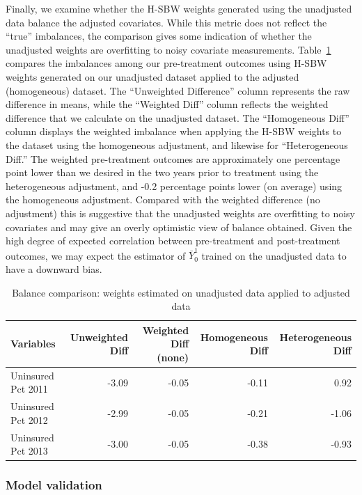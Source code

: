 \documentclass[aoas]{imsart}
\theoremstyle{plain}
\theoremstyle{remark}
\begin{document}
Finally, we examine whether the H-SBW weights generated using the unadjusted data balance the adjusted covariates. While this metric does not reflect the ``true'' imbalances, the comparison gives some indication of whether the unadjusted weights are overfitting to noisy covariate measurements. Table~\ref{tab:balcomp} compares the imbalances among our pre-treatment outcomes using H-SBW weights generated on our unadjusted dataset applied to the adjusted (homogeneous) dataset. The ``Unweighted Difference'' column represents the raw difference in means, while the ``Weighted Diff'' column reflects the weighted difference that we calculate on the unadjusted dataset. The ``Homogeneous Diff'' column displays the weighted imbalance when applying the H-SBW weights to the dataset using the homogeneous adjustment, and likewise for ``Heterogeneous Diff.'' The weighted pre-treatment outcomes are approximately one percentage point lower than we desired in the two years prior to treatment using the heterogeneous adjustment, and -0.2 percentage points lower (on average) using the homogeneous adjustment. Compared with the weighted difference (no adjustment) this is suggestive that the unadjusted weights are overfitting to noisy covariates and may give an overly optimistic view of balance obtained. Given the high degree of expected correlation between pre-treatment and post-treatment outcomes, we may expect the estimator of $\bar{Y}^1_0$ trained on the unadjusted data to have a downward bias.

\begin{table}[ht]
\caption{Balance comparison: weights estimated on unadjusted data applied to adjusted data}
\label{tab:balcomp}
\begin{tabular}{lrrrr}
  \hline
Variables & Unweighted Diff & Weighted Diff (none) & Homogeneous Diff & Heterogeneous Diff\\ 
  \hline
Uninsured Pct 2011 & -3.09 & -0.05 & -0.11 & 0.92 \\ 
  Uninsured Pct 2012 & -2.99 & -0.05 & -0.21 & -1.06 \\ 
  Uninsured Pct 2013 & -3.00 & -0.05 & -0.38 & -0.93 \\
   \hline
\end{tabular}
\end{table}

\subsubsection{Model validation}
\end{document}
